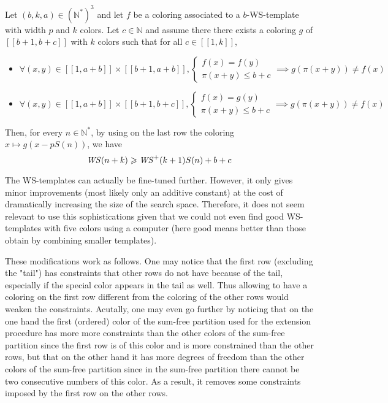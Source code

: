 \begin{proposition}
Let \((b, k, a) \in (\mathbb{N}^*)^3\) and let \(f\) be a coloring associated to a \(b\)-WS-template with width \(p\) and \(k\) colors. Let
\(c \in \mathbb{N}\) and assume there there exists a coloring \(g\) of \([\![b + 1, b + c]\!]\) with \(k\) colors such that for all \(c \in [\![1, k]\!]\),

\begin{itemize}
\item \(\forall (x, y) \in  [\![1, a + b]\!] \times  [\![b + 1, a + b]\!],  \left\{
	\begin{array}{l}
		f(x) = f(y) \\
		\pi(x + y) \leqslant b + c
	\end{array}
	\right. \implies g(\pi(x + y)) \neq f(x)\)
\item \(\forall (x, y) \in  [\![1, a + b]\!] \times  [\![b + 1, b + c]\!], \left\{
	\begin{array}{l}
		f(x) = g(y) \\
		\pi(x + y) \leqslant b + c
	\end{array}
	\right. \implies g(\pi(x + y)) \neq f(x)\)
\end{itemize}

Then, for every \(n \in \mathbb{N}^*\), by using on the last row the coloring \(x \longmapsto g(x - p S(n))\), we have\\
\[ \mathit{WS}(n+k) \geqslant \mathit{WS}^+(k+1) S(n) + b + c\]
\end{proposition}

The WS-templates can actually be fine-tuned further. However, it only gives minor improvements (most likely only an additive
constant) at the cost of dramatically increasing the size of the search space. Therefore, it does not seem relevant to
use this sophistications given that we could not even find good WS-templates with five colors using a computer (here good
means better than those obtain by combining smaller templates).

\par These modifications work as follows. One may notice that the first row (excluding the "tail") has constraints that other rows
do not have because of the tail, especially if the special color appears in the tail as well. Thus allowing to have a coloring on the
first row different from the coloring of the other rows would weaken the constraints. Acutally, one may even go further by
noticing that on the one hand the first (ordered) color of the sum-free partition used for the extension procedure has more
more constraints than the other colors of the sum-free partition since the first row is of this color and is more constrained than
the other rows, but that on the other hand it has more degrees of freedom than the other colors of the sum-free partition since in
the sum-free partition there cannot be two consecutive numbers of this color. As a result, it removes  some constraints imposed
 by the first row on the other rows.

